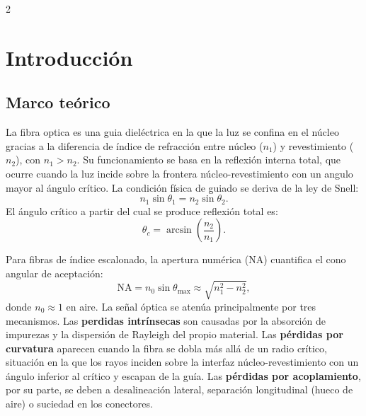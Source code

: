 \documentclass[12pt,a4paper]{article}
\begin{document}
\begin{multicols}{2}

\section{Introducción}

\subsection{Marco teórico}

La fibra optica es una guia dieléctrica en la que la luz se confina en el núcleo gracias a la diferencia de índice de refracción entre núcleo ($n_1$) y revestimiento ($n_2$), con $n_1>n_2$. Su funcionamiento se basa en la reflexión interna total, que ocurre cuando la luz incide sobre la frontera núcleo-revestimiento con un angulo mayor al ángulo crítico. La condición física de guiado se deriva de la ley de Snell:
\begin{equation}
n_1\sin\theta_1 = n_2\sin\theta_2.
\label{eq:snell}
\end{equation}
El ángulo crítico a partir del cual se produce reflexión total es:
\begin{equation}
\theta_c = \arcsin\!\left(\frac{n_2}{n_1}\right).
\label{eq:theta_crit}
\end{equation}

Para fibras de índice escalonado, la apertura numérica (NA) cuantifica el cono angular de aceptación:
\begin{equation}
\mathrm{NA}=n_0\sin\theta_{\max}\approx\sqrt{n_1^2-n_2^2},
\label{eq:na}
\end{equation}
donde $n_0\approx 1$ en aire. La señal óptica se atenúa principalmente por tres mecanismos. Las \textbf{perdidas intrínsecas} son causadas por la absorción de impurezas y la dispersión de Rayleigh del propio material. Las \textbf{pérdidas por curvatura} aparecen cuando la fibra se dobla más allá de un radio crítico, situación en la que los rayos inciden sobre la interfaz núcleo-revestimiento con un ángulo inferior al crítico y escapan de la guía. Las \textbf{pérdidas por acoplamiento}, por su parte, se deben a desalineación lateral, separación longitudinal (hueco de aire) o suciedad en los conectores.


\end{multicols}
\end{document}
